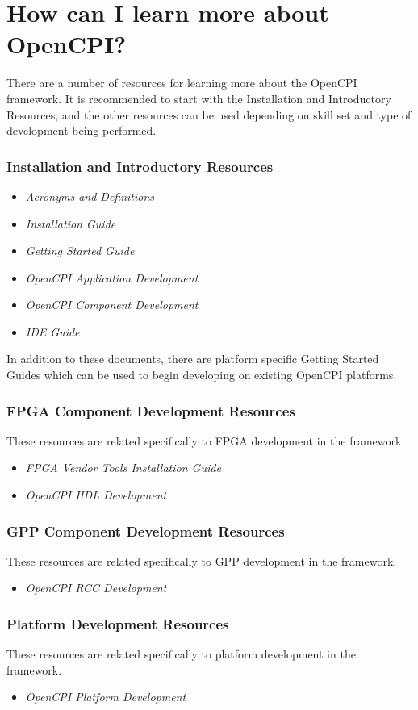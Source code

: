 \section*{How can I learn more about OpenCPI?}
There are a number of resources for learning more about the OpenCPI framework. It is recommended to start with the Installation and Introductory Resources, and the other resources can be used depending on skill set and type of development being performed.
\subsubsection*{Installation and Introductory Resources}
\begin{itemize}
\item \textit{Acronyms and Definitions}
\item \textit{Installation Guide}
\item \textit{Getting Started Guide}
\item \textit{OpenCPI Application Development}
\item \textit{OpenCPI Component Development}
\item \textit{IDE Guide}
\end{itemize}
In addition to these documents, there are platform specific Getting Started Guides which can be used to begin developing on existing OpenCPI platforms.
\subsubsection*{FPGA Component Development Resources}
These resources are related specifically to FPGA development in the framework.
\begin{itemize}
\item \textit{FPGA Vendor Tools Installation Guide}
\item \textit{OpenCPI HDL Development}
\end{itemize}
\subsubsection*{GPP Component Development Resources}
These resources are related specifically to GPP development in the framework.
\begin{itemize}
\item \textit{OpenCPI RCC Development}
\end{itemize}
\subsubsection*{Platform Development Resources}
These resources are related specifically to platform development in the framework.
\begin{itemize}
\item \textit{OpenCPI Platform Development}
\end{itemize}
